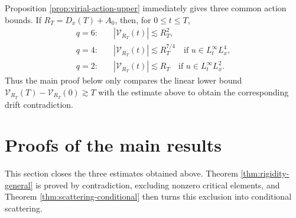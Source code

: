 \documentclass[10pt,a4paper]{amsart}
\numberwithin{equation}{section}
\begin{document}
Proposition \ref{prop:virial-action-upper} immediately gives three common action bounds. If $R_T=D_x(T)+A_0$, then, for $0\le t\le T$,
\[
\begin{aligned}
  q=6:\quad& |\mathcal V_{R_T}(t)|\lesssim R_T^2,\\
  q=4:\quad& |\mathcal V_{R_T}(t)|\lesssim R_T^{7/4}
        \quad\text{if }u\in L_t^\infty L_x^4,\\
  q=2:\quad& |\mathcal V_{R_T}(t)|\lesssim R_T
        \quad\text{if }u\in L_t^\infty L_x^2.
\end{aligned}
\]
Thus the main proof below only compares the linear lower bound $\mathcal V_{R_T}(T)-\mathcal V_{R_T}(0)\gtrsim T$ with the estimate above to obtain the corresponding drift contradiction.

\section{Proofs of the main results}\label{sec:main-proofs}

This section closes the three estimates obtained above. Theorem \ref{thm:rigidity-general} is proved by contradiction, excluding nonzero critical elements, and Theorem \ref{thm:scattering-conditional} then turns this exclusion into conditional scattering.
\end{document}
